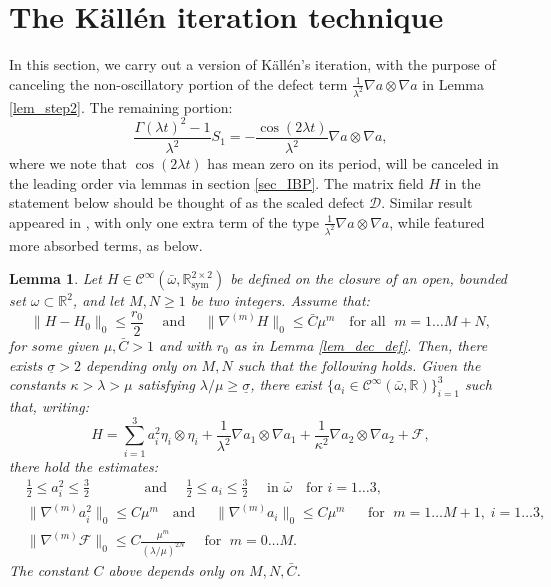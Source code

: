 \documentclass[reqno,twoside,11pt]{amsart}
\newcommand{\sym}{\mathrm{sym}}
\newcommand{\R}{\mathbb{R}}
\numberwithin{equation}{section}
\theoremstyle{plain}
\newtheorem{lemma}[theorem]{Lemma}
\theoremstyle{definition}
\begin{document}
\section{The K\"all\'en iteration technique}\label{sec_kallen}

In this section, we carry out a version of K\"all\'en's
iteration, with the purpose of canceling the non-oscillatory  portion
of the defect term $\frac{1}{\lambda^2}\nabla a\otimes\nabla a$ in
Lemma \ref{lem_step2}. The remaining portion: 
$$\frac{\Gamma(\lambda t)^2
-1}{\lambda^2} S_1= -\frac{\cos(2\lambda t)}{\lambda^2}
\nabla a\otimes\nabla a,$$ 
where we note that $\cos(2\lambda t)$ has mean zero on its period,
will be canceled in the leading order via lemmas in section \ref{sec_IBP}. The matrix field $H$
in the statement below should be thought of as the scaled defect
$\mathcal{D}$. Similar result appeared in \cite[Proposition
3.1]{in_lew2}, with only one extra term of the type
$\frac{1}{\lambda^2}\nabla a\otimes\nabla a$, while \cite[Lemma
2.2]{CHI2} featured more absorbed terms, as below. 

\begin{lemma}\label{prop1}
Let $H\in \mathcal{C}^\infty(\bar\omega,\R^{2\times 2}_\sym)$ be
defined on the closure of an open, bounded set $\omega\subset\R^2$,
and let $M, N\geq 1$ be two integers. Assume that:
\begin{equation}\label{ass_H0}
\|H-H_0\|_0\leq \frac{r_0}{2} \quad\mbox{ and }\quad 
\|\nabla^{(m)}H\|_0\leq \bar C\mu^m \quad \mbox{for all } \; m=1\ldots M+N,
\end{equation}
 for some given $\mu, \bar C>1$ and with $r_0$ as in Lemma \ref{lem_dec_def}.
Then, there exists $\underline \sigma >2$ depending only on $M, N$
such that the following holds. Given the constants 
$\kappa>\lambda>\mu$ satisfying $\lambda/\mu\geq \underline\sigma$,
there exist $\{a_i\in \mathcal{C}^\infty(\bar\omega,\R)\}_{i=1}^3$
such that, writing:
$$H= \sum_{i=1}^3 a_i^2\eta_i\otimes\eta_i + \frac{1}{\lambda^2}\nabla
a_1\otimes\nabla a_1 + \frac{1}{\kappa^2}\nabla a_2\otimes\nabla a_2 + \mathcal{F},$$
there hold the estimates:
\begin{equation}\label{Ebounds}
\begin{split}
&  \frac{1}{2}\leq a_i^2\leq \frac{3}{2} \; \; \quad \qquad \mbox{ and }\quad 
\frac{1}{2}\leq a_i\leq \frac{3}{2} \quad\mbox{ in }\bar\omega \quad \mbox{
for } i=1\ldots 3,\\
& \|\nabla^{(m)} a_i^2\|_0\leq C\mu^m\quad 
\mbox{and } \quad \|\nabla^{(m)} a_i\|_0\leq C\mu^m \;\quad\mbox{ for }\;
 m=1\ldots M+1,\;  i=1\ldots 3,\\
& \|\nabla^{(m)}\mathcal{F}\|_0\leq
C\frac{\mu^m}{(\lambda/\mu)^{2N}}\quad\mbox{ for } \; m=0\ldots M.  
\end{split}
\end{equation}
The constant $C$ above depends only on $ M, N, \bar C$.
\end{lemma}
\end{document}
